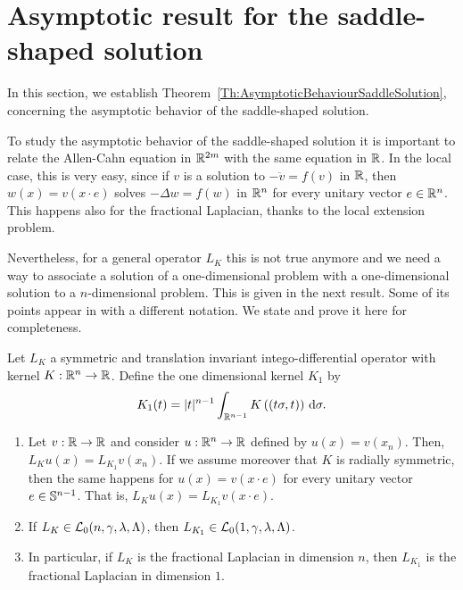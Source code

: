 \section{Asymptotic result for the saddle-shaped solution}
\label{Sec:Asymptotic}

In this section, we establish Theorem~\ref{Th:AsymptoticBehaviourSaddleSolution}, concerning the asymptotic behavior of the saddle-shaped solution. 



To study the asymptotic behavior of the saddle-shaped solution it is important to relate the Allen-Cahn equation in $\mathbb{R}^{2m}$ with the same equation in $\mathbb{R}$. In the local case, this is very easy, since if $v$ is a solution to $-\ddot{v} = f(v)$ in $\mathbb{R}$,  then $w(x) = v(x\cdot e)$ solves $-\Delta w = f(w)$ in $\mathbb{R}^n$ for every unitary vector $e\in \mathbb{R}^n$. This happens also for the fractional Laplacian, thanks to the local extension problem.

Nevertheless, for a general operator $L_K$ this is not true anymore and we need a way to associate a solution of a one-dimensional problem with a one-dimensional solution to a $n$-dimensional problem. This is given in the next result. Some of its points appear in \cite{CozziPassalacqua} with a different notation. We state and prove it here for completeness.

\begin{proposition}
	\label{Prop:KernelsDimension}
	Let $L_K $ a symmetric and translation invariant intego-differential operator with kernel $K:\mathbb{R}^n \to \mathbb{R}$. Define the one dimensional kernel $K_1$ by
	$$ K_1(t) = |t|^{n-1} \int_{\mathbb{R}^{n-1}} K\left((t\sigma,t)\right) \,\mathrm{d} \sigma. $$
	\begin{enumerate}[label=(\roman{*})]
		\item Let $v:\mathbb{R}\to\mathbb{R}$ and consider $u:\mathbb{R}^n\to\mathbb{R}$ defined by $u(x) = v(x_n)$. Then, $L_K u(x) = L_{K_1} v(x_n)$. If we assume moreover that $K$ is radially symmetric, then the same happens for $u(x) = v(x\cdot e)$ for every unitary vector $e\in \mathbb{S}^{n-1}$. That is, $L_K u(x) = L_{K_1} v(x \cdot e)$.
		\item If $L_K \in \mathcal{L}_0 (n,\gamma,\lambda,\Lambda)$, then   $L_{K_1} \in \mathcal{L}_0 (1,\gamma,\lambda,\Lambda)$.
		\item In particular, if $L_K $ is the fractional Laplacian in dimension $n$, then $L_{K_1}$ is the fractional Laplacian in dimension $1$.
		
	\end{enumerate}
\end{proposition}


